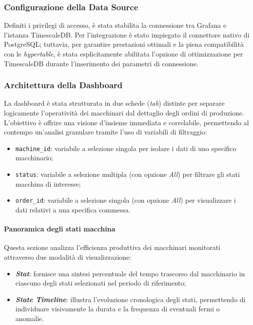 \documentclass[12pt]{article}
\begin{document}
    \subsubsection{Configurazione della Data Source}
    
    Definiti i privilegi di accesso, è stata stabilita la connessione tra Grafana e l'istanza TimescaleDB. Per l'integrazione è stato impiegato il connettore nativo di PostgreSQL; tuttavia, per garantire prestazioni ottimali e la piena compatibilità con le \textit{hypertable}, è stata esplicitamente abilitata l'opzione di ottimizzazione per TimescaleDB durante l'inserimento dei parametri di connessione.
    
    \subsubsection{Architettura della Dashboard}
    
    La dashboard è stata strutturata in due schede (\textit{tab}) distinte per separare logicamente l'operatività dei macchinari dal dettaglio degli ordini di produzione. L'obiettivo è offrire una visione d'insieme immediata e correlabile, permettendo al contempo un'analisi granulare tramite l'uso di variabili di filtraggio:
    
    \begin{itemize}
        \item \texttt{machine\_id}: variabile a selezione singola per isolare i dati di uno specifico macchinario;
        \item \texttt{status}: variabile a selezione multipla (con opzione \textit{All}) per filtrare gli stati macchina di interesse;
        \item \texttt{order\_id}: variabile a selezione singola (con opzione \textit{All}) per visualizzare i dati relativi a una specifica commessa.
    \end{itemize}
    
    \paragraph{Panoramica degli stati macchina}
    Questa sezione analizza l'efficienza produttiva dei macchinari monitorati attraverso due modalità di visualizzazione:
    \begin{itemize}
        \item \textit{\textbf{Stat}}: fornisce una sintesi percentuale del tempo trascorso dal macchinario in ciascuno degli stati selezionati nel periodo di riferimento;
        \item \textit{\textbf{State Timeline}}: illustra l'evoluzione cronologica degli stati, permettendo di individuare visivamente la durata e la frequenza di eventuali fermi o anomalie.
    \end{itemize}
    
\end{document}
